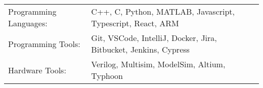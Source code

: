 \begin{tabularx}{\linewidth}{@{}l X@{}}
Programming Languages: &  \normalsize{C++, C, Python, MATLAB, Javascript, Typescript, React, ARM}\\
Programming Tools:  &  \normalsize{Git, VSCode, IntelliJ, Docker, Jira, Bitbucket, Jenkins, Cypress}\\
Hardware Tools: & \normalsize{Verilog, Multisim, ModelSim, Altium, Typhoon} \\
\end{tabularx}